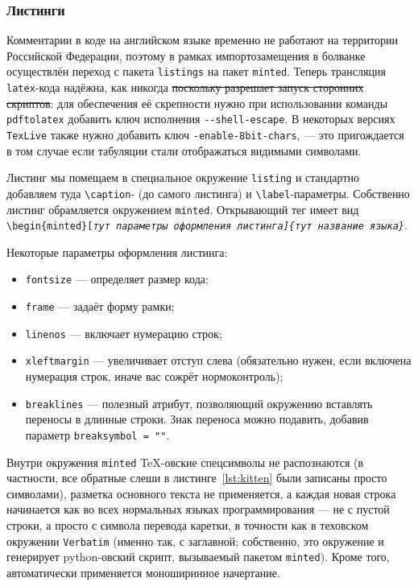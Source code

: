\documentclass[14pt, russian]{scrartcl}
\begin{document}
\subsubsection{Листинги}

Комментарии в коде на английском языке временно не работают на территории Российской Федерации, поэтому в рамках импортозамещения в болванке осуществлён переход с пакета \texttt{listings} на пакет \texttt{minted}. Теперь трансляция \texttt{latex}-кода надёжна, как никогда \sout{поскольку разрешает запуск сторонних скриптов}: для обеспечения её скрепности нужно при использовании команды \texttt{pdftolatex} добавить ключ исполнения \texttt{-{}-shell-escape}. В некоторых версиях \texttt{TexLive} также нужно добавить ключ \texttt{-enable-8bit-chars}, --- это пригождается в том случае если табуляции стали отображаться видимыми символами.

Листинг мы помещаем в специальное окружение \texttt{listing} и стандартно добавляем туда \texttt{\textbackslash caption}- (до самого листинга) и \texttt{\textbackslash label}-параметры. Собственно листинг обрамляется окружением \texttt{minted}. Открывающий тег имеет вид \texttt{\textbackslash begin\{minted\}[\itshape{тут параметры оформления листинга}]\{\itshape{тут название языка}\}}.

Некоторые параметры оформления листинга:
\begin{itemize}
\item \texttt{fontsize} --- определяет размер кода;
\item \texttt{frame} --- задаёт форму рамки;
\item \texttt{linenos} --- включает нумерацию строк;
\item \texttt{xleftmargin} --- увеличивает отступ слева (обязательно нужен, если включена нумерация строк, иначе вас сожрёт нормоконтроль);
\item \texttt{breaklines} --- полезный атрибут, позволяющий окружению вставлять переносы в длинные строки. Знак переноса можно подавить, добавив параметр \texttt{breaksymbol = "{}"{}}.
\end{itemize}

Внутри окружения \texttt{minted} \TeX-овские спецсимволы не распознаются (в частности, все обратные слеши в листинге~\ref{lst:kitten} были записаны просто символами), разметка основного текста не применяется, а каждая новая строка начинается как во всех нормальных языках программирования --- не с пустой строки, а просто с символа перевода каретки, в точности как в теховском окружении \texttt{Verbatim} (именно так, с заглавной; собственно, это окружение и генерирует python-овский скрипт, вызываемый пакетом \texttt{minted}). Кроме того, автоматически применяется моноширинное начертание.
\end{document}
